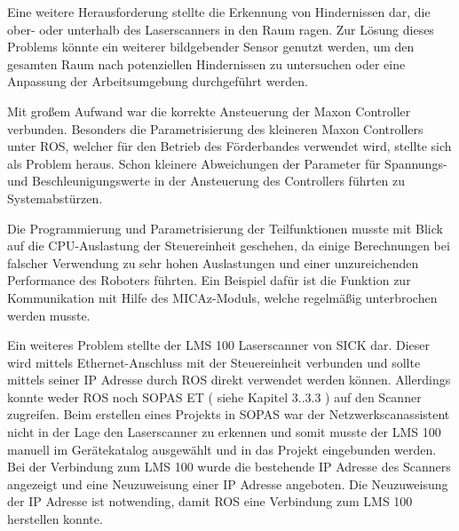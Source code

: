 Eine weitere Herausforderung stellte die Erkennung von Hindernissen dar, die ober- oder unterhalb des Laserscanners in den Raum ragen. Zur Lösung dieses Problems könnte ein weiterer bildgebender Sensor genutzt werden, um den gesamten Raum nach potenziellen Hindernissen zu untersuchen oder eine Anpassung der Arbeitsumgebung durchgeführt werden.

Mit großem Aufwand war die korrekte Ansteuerung der Maxon Controller verbunden. Besonders die Parametrisierung des kleineren Maxon Controllers unter ROS, welcher für den Betrieb des Förderbandes verwendet wird, stellte sich als Problem heraus. Schon kleinere Abweichungen der Parameter für Spannungs- und Beschleunigungswerte in der Ansteuerung des Controllers führten zu Systemabstürzen.
 
Die Programmierung und Parametrisierung der Teilfunktionen musste mit Blick auf
die CPU-Auslastung der Steuereinheit geschehen, da einige Berechnungen bei falscher
Verwendung zu sehr hohen Auslastungen und einer unzureichenden Performance des
Roboters führten. Ein Beispiel dafür ist die Funktion zur Kommunikation mit Hilfe des MICAz-Moduls, welche     regelmäßig unterbrochen werden musste.

Ein weiteres Problem stellte der LMS 100 Laserscanner von SICK dar. Dieser wird mittels Ethernet-Anschluss mit der Steuereinheit verbunden und sollte mittels seiner IP Adresse durch ROS direkt verwendet werden können. Allerdings konnte weder ROS noch SOPAS ET ( siehe Kapitel 3..3.3 ) auf den Scanner zugreifen. Beim erstellen eines Projekts in SOPAS war der Netzwerkscanassistent nicht in der Lage den Laserscanner zu erkennen und somit musste der LMS 100 manuell im Gerätekatalog ausgewählt und in das Projekt eingebunden werden. Bei der Verbindung zum LMS 100 wurde die bestehende IP Adresse des Scanners angezeigt und eine Neuzuweisung einer IP Adresse angeboten. Die Neuzuweisung der IP Adresse ist notwending, damit ROS eine Verbindung zum LMS 100 herstellen konnte.
